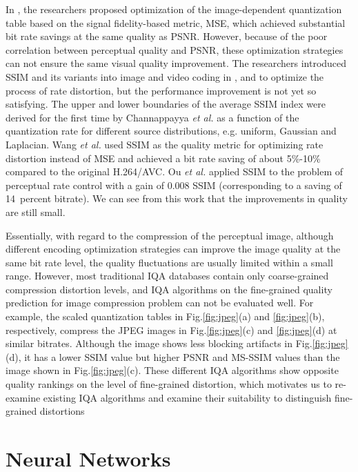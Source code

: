 In \cite{Ratnakar2000}, the researchers proposed optimization of the image-dependent quantization table based on the signal fidelity-based metric, MSE, which achieved substantial bit rate savings at the same quality as PSNR. However, because of the poor correlation between perceptual quality and PSNR, these optimization strategies can not ensure the same visual quality improvement. The researchers introduced SSIM and its variants into image and video coding in \cite{Channappayya2008}, \cite{Wang2012} and \cite{Ou2011} to optimize the process of rate distortion, but the performance improvement is not yet so satisfying. The upper and lower boundaries of the average SSIM index were derived for the first time by Channappayya \emph{et al.}\cite{Channappayya2008} as a function of the quantization rate for different source distributions, e.g. uniform, Gaussian and Laplacian. Wang \emph{et al.}\cite{Wang2012} used SSIM as the quality metric for optimizing rate distortion instead of MSE and achieved a bit rate saving of about 5\%-10\% compared to the original H.264/AVC. Ou \emph{et al.} \cite{Ou2011} applied SSIM to the problem of perceptual rate control with a gain of 0.008 SSIM (corresponding to a saving of 14\ percent bitrate). We can see from this work that the improvements in quality are still small. 

Essentially, with regard to the compression of the perceptual image, although different encoding optimization strategies can improve the image quality at the same bit rate level, the quality fluctuations are usually limited within a small range. However, most traditional IQA databases contain only coarse-grained compression distortion levels, and IQA algorithms on the fine-grained quality prediction for image compression problem can not be evaluated well. For example, the scaled quantization tables in Fig.\ref{fig:jpeg}(a) and \ref{fig:jpeg}(b), respectively, compress the JPEG images in Fig.\ref{fig:jpeg}(c) and \ref{fig:jpeg}(d) at similar bitrates. Although the image shows less blocking artifacts in Fig.\ref{fig:jpeg}(d), it has a lower SSIM value but higher PSNR and MS-SSIM values than the image shown in Fig.\ref{fig:jpeg}(c). These different IQA algorithms show opposite quality rankings on the level of fine-grained distortion, which motivates us to re-examine existing IQA algorithms and examine their suitability to distinguish fine-grained distortions 

\section{Neural Networks}


